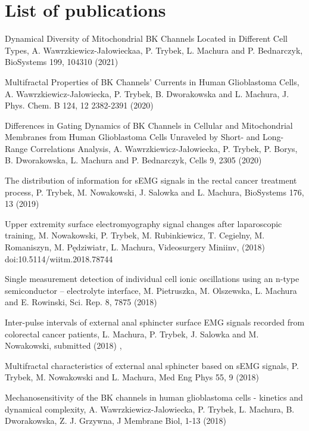 \section{List of publications}
  \begin{etaremune}  %
  \item Dynamical Diversity of Mitochondrial BK Channels Located in Different Cell Types, A. Wawrzkiewicz-Jałowieckaa, P. Trybek, L. Machura and P. Bednarczyk, BioSystems 199,  104310 (2021) 

\item Multifractal Properties of BK Channels’ Currents in Human Glioblastoma Cells, A. Wawrzkiewicz-Jałowiecka, P. Trybek, B. Dworakowska and L. Machura, J. Phys. Chem. B 124,  12  2382-2391  (2020)

\item Differences in Gating Dynamics of BK Channels in Cellular and Mitochondrial Membranes from Human Glioblastoma Cells Unraveled by Short- and Long-Range Correlations Analysis, A. Wawrzkiewicz-Jałowiecka, P. Trybek, P. Borys, B. Dworakowska, L. Machura and P. Bednarczyk, Cells 9,  2305 (2020)

\item The distribution of information for sEMG signals in the rectal cancer treatment process, P. Trybek, M. Nowakowski, J. Salowka and L. Machura, BioSystems 176,  13 (2019)

\item Upper extremity surface electromyography signal changes after laparoscopic training, M. Nowakowski, P. Trybek, M. Rubinkiewicz, T. Cegielny, M. Romaniszyn, M. Pędziwiatr, L. Machura, Videosurgery Miniinv,  (2018)  doi:10.5114/wiitm.2018.78744

\item Single measurement detection of individual cell ionic oscillations using an n-type semiconductor – electrolyte interface, M. Pietruszka, M. Olszewska, L. Machura and E. Rowinski, Sci. Rep. 8,  7875 (2018)

\item Inter-pulse intervals of external anal sphincter surface EMG signals recorded from colorectal cancer patients, L. Machura, P. Trybek, J. Salowka and M. Nowakowski, submitted (2018)
, 
\item Multifractal characteristics of external anal sphincter based on sEMG signals, P. Trybek, M. Nowakowski and L. Machura, Med Eng Phys 55,  9 (2018)

\item Mechanosensitivity of the BK channels in human glioblastoma cells - kinetics and dynamical complexity, A. Wawrzkiewicz-Jalowiecka, P. Trybek, L. Machura, B. Dworakowska, Z. J. Grzywna, J Membrane Biol,  1-13 (2018)


\end{etaremune}
